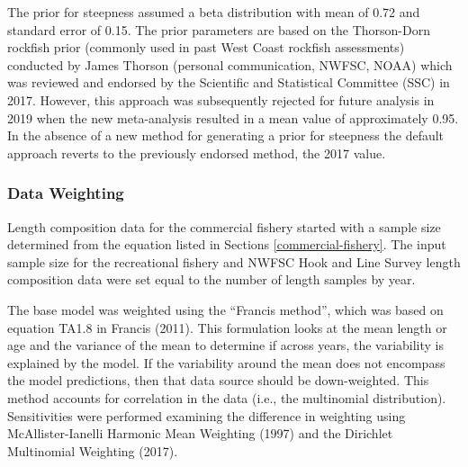 \documentclass[11pt,
  english,
  a4paper,
]{article}
\begin{document}
\leavevmode\tagmcend\tagstructend\par


The prior for steepness assumed a beta distribution with mean of 0.72 and standard error of 0.15. The prior parameters are based on the Thorson-Dorn rockfish prior (commonly used in past West Coast rockfish assessments) conducted by James Thorson (personal communication, NWFSC, NOAA) which was reviewed and endorsed by the Scientific and Statistical Committee (SSC) in 2017. However, this approach was subsequently rejected for future analysis in 2019 when the new meta-analysis resulted in a mean value of approximately 0.95. In the absence of a new method for generating a prior for steepness the default approach reverts to the previously endorsed method, the 2017 value.

\leavevmode\tagmcend\tagstructend\par


\hypertarget{data-weighting}{%
\subsubsection{Data Weighting}\label{data-weighting}}

\leavevmode\tagmcend\tagstructend


Length composition data for the commercial fishery started with a sample size determined from the equation listed in Sections \ref{commercial-fishery}. The input sample size for the recreational fishery and NWFSC Hook and Line Survey length composition data were set equal to the number of length samples by year.

\leavevmode\tagmcend\tagstructend\par


The base model was weighted using the ``Francis method'', which was based on equation TA1.8 in Francis {(2011)\leavevmode\tagmcend\tagstructend}. This formulation looks at the mean length or age and the variance of the mean to determine if across years, the variability is explained by the model. If the variability around the mean does not encompass the model predictions, then that data source should be down-weighted. This method accounts for correlation in the data (i.e., the multinomial distribution). Sensitivities were performed examining the difference in weighting using McAllister-Ianelli Harmonic Mean Weighting {(1997)\leavevmode\tagmcend\tagstructend} and the Dirichlet Multinomial Weighting {(2017)\leavevmode\tagmcend\tagstructend}.
\end{document}
